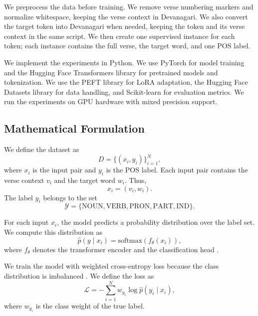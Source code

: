 \documentclass[conference]{IEEEtran}
\begin{document}
We preprocess the data before training. We remove verse numbering markers and normalize whitespace, keeping the verse context in Devanagari. We also convert the target token into Devanagari when needed, keeping the token and its verse context in the same script. We then create one supervised instance for each token; each instance contains the full verse, the target word, and one POS label.

We implement the experiments in Python. We use PyTorch \cite{paszke2019pytorch} for model training and the Hugging Face Transformers library \cite{wolf2020transformers} for pretrained models and tokenization. We use the PEFT library \cite{mangrulkar2022peft} for LoRA adaptation, the Hugging Face Datasets library \cite{lhoest2021datasets} for data handling, and Scikit-learn \cite{pedregosa2011sklearn} for evaluation metrics. We run the experiments on GPU hardware with mixed precision support.

\subsection{Mathematical Formulation}
We define the dataset as
\begin{equation}
D = \{(x_i, y_i)\}_{i=1}^{N},
\end{equation}
where $x_i$ is the input pair and $y_i$ is the POS label. Each input pair contains the verse context $v_i$ and the target word $w_i$. Thus,
\begin{equation}
x_i = (v_i, w_i).
\end{equation}
The label $y_i$ belongs to the set
\begin{equation}
\mathcal{Y} = \{\text{NOUN}, \text{VERB}, \text{PRON}, \text{PART}, \text{IND}\}.
\end{equation}

For each input $x_i$, the model predicts a probability distribution over the label set. We compute this distribution as
\begin{equation}
\hat{p}(y \mid x_i) = \text{softmax}(f_{\theta}(x_i)),
\end{equation}
where $f_{\theta}$ denotes the transformer encoder and the classification head \cite{devlin2019bert}.

We train the model with weighted cross-entropy loss because the class distribution is imbalanced \cite{cui2019classbalanced}. We define the loss as
\begin{equation}
\mathcal{L} = - \sum_{i=1}^{N} w_{y_i}\log \hat{p}(y_i \mid x_i),
\end{equation}
where $w_{y_i}$ is the class weight of the true label.
\end{document}
